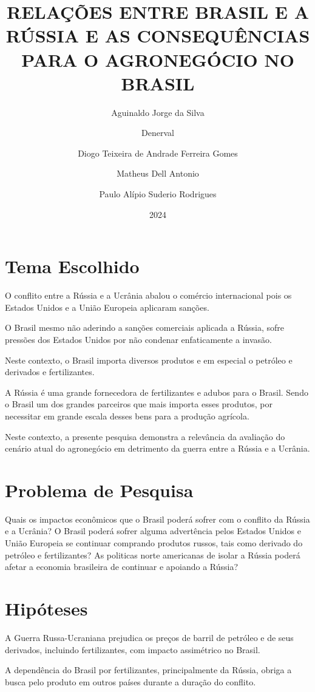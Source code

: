 \documentclass[article,12pt,oneside,a4paper,english,brazil,sumario=tradicional]{abntex2}
\author{Aguinaldo Jorge da Silva \and Denerval \and Diogo Teixeira de Andrade Ferreira Gomes \and Matheus Dell Antonio \and Paulo Alípio Suderio Rodrigues}
\date{2024}
\title{RELAÇÕES ENTRE BRASIL E A RÚSSIA E AS CONSEQUÊNCIAS PARA O AGRONEGÓCIO NO BRASIL}
\begin{document}
\frenchspacing
\maketitle
\textual
\section*{Tema Escolhido}

O conflito entre a Rússia e a Ucrânia abalou o comércio internacional pois os Estados Unidos e a União Europeia aplicaram sanções. 

O Brasil mesmo não aderindo a sanções comerciais aplicada a Rússia, sofre pressões dos Estados Unidos por não condenar enfaticamente a invasão.

Neste contexto, o Brasil importa diversos produtos e em especial o petróleo e derivados e fertilizantes.

A Rússia é uma grande fornecedora de fertilizantes e adubos para o Brasil. Sendo o Brasil um dos grandes parceiros que mais importa esses produtos, por necessitar em grande escala desses bens para a produção agrícola.

Neste contexto, a presente pesquisa demonstra a relevância da avaliação do cenário atual do agronegócio em detrimento da guerra entre a Rússia e a Ucrânia. 

\section*{Problema de Pesquisa}

Quais os impactos econômicos que o Brasil poderá sofrer com o conflito da Rússia e a Ucrânia? O Brasil poderá sofrer alguma advertência pelos Estados Unidos e União Europeia se continuar comprando produtos russos, tais como derivado do petróleo e fertilizantes? As politicas norte americanas de isolar a Rússia poderá afetar a economia brasileira de continuar e apoiando a Rússia?

\section*{Hipóteses}

A Guerra Russa-Ucraniana prejudica os preços de barril de petróleo e de seus derivados, incluindo fertilizantes, com impacto assimétrico no Brasil.

A dependência do Brasil por fertilizantes, principalmente da Rússia, obriga a busca pelo produto em outros países durante a duração do conflito.
\end{document}
